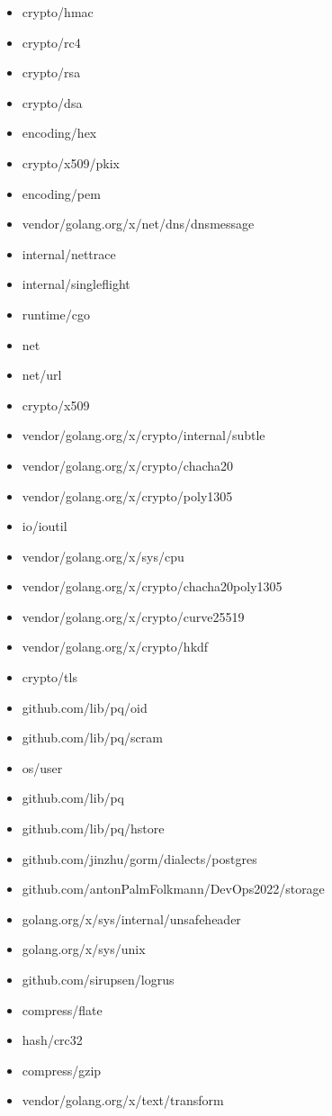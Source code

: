 \begin{itemize}
    \item crypto/hmac
    \item crypto/rc4
    \item crypto/rsa
    \item crypto/dsa
    \item encoding/hex
    \item crypto/x509/pkix
    \item encoding/pem
    \item vendor/golang.org/x/net/dns/dnsmessage
    \item internal/nettrace
    \item internal/singleflight
    \item runtime/cgo
    \item net
    \item net/url
    \item crypto/x509
    \item vendor/golang.org/x/crypto/internal/subtle
    \item vendor/golang.org/x/crypto/chacha20
    \item vendor/golang.org/x/crypto/poly1305
    \item io/ioutil
    \item vendor/golang.org/x/sys/cpu
    \item vendor/golang.org/x/crypto/chacha20poly1305
    \item vendor/golang.org/x/crypto/curve25519
    \item vendor/golang.org/x/crypto/hkdf
    \item crypto/tls
    \item github.com/lib/pq/oid
    \item github.com/lib/pq/scram
    \item os/user
    \item github.com/lib/pq
    \item github.com/lib/pq/hstore
    \item github.com/jinzhu/gorm/dialects/postgres
    \item github.com/antonPalmFolkmann/DevOps2022/storage
    \item golang.org/x/sys/internal/unsafeheader
    \item golang.org/x/sys/unix
    \item github.com/sirupsen/logrus
    \item compress/flate
    \item hash/crc32
    \item compress/gzip
    \item vendor/golang.org/x/text/transform

\end{itemize}
